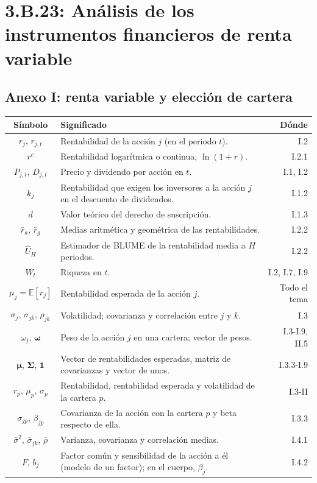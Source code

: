 \documentclass[10pt,a4paper]{article}
\newcommand{\cabecera}{\toprule\textbf{Símbolo} & \textbf{Significado} & \textbf{Dónde}\\\midrule\endhead\bottomrule\endfoot}
\begin{document}
\section{3.B.23: Análisis de los instrumentos financieros de renta variable}
\subsection*{Anexo I: renta variable y elección de cartera}
\begin{longtable}{SMD}
\cabecera
$r_j$, $r_{j,t}$ & Rentabilidad de la acción $j$ (en el periodo $t$). & I.2\\
$r^c$ & Rentabilidad logarítmica o continua, $\ln(1+r)$. & I.2.1\\
$P_{j,t}$, $D_{j,t}$ & Precio y dividendo por acción en $t$. & I.1, I.2\\
$k_j$ & Rentabilidad que exigen los inversores a la acción $j$ en el descuento de dividendos. & I.1.2\\
$d$ & Valor teórico del derecho de suscripción. & I.1.3\\
$\bar r_a$, $\bar r_g$ & Medias aritmética y geométrica de las rentabilidades. & I.2.2\\
$\hat U_H$ & Estimador de BLUME de la rentabilidad media a $H$ periodos. & I.2.2\\
$W_t$ & Riqueza en $t$. & I.2, I.7, I.9\\
$\mu_j=\mathbb E[r_j]$ & Rentabilidad esperada de la acción $j$. & Todo el tema\\
$\sigma_j$, $\sigma_{jk}$, $\rho_{jk}$ & Volatilidad; covarianza y correlación entre $j$ y $k$. & I.3\\
$\omega_j$, $\boldsymbol\omega$ & Peso de la acción $j$ en una cartera; vector de pesos. & I.3-I.9, II.5\\
$\boldsymbol\mu$, $\boldsymbol\Sigma$, $\mathbf 1$ & Vector de rentabilidades esperadas, matriz de covarianzas y vector de unos. & I.3.3-I.9\\
$r_p$, $\mu_p$, $\sigma_p$ & Rentabilidad, rentabilidad esperada y volatilidad de la cartera $p$. & I.3-II\\
$\sigma_{jp}$, $\beta_{jp}$ & Covarianza de la acción con la cartera $p$ y beta respecto de ella. & I.3.3\\
$\bar\sigma^2$, $\bar\sigma_{jk}$, $\bar\rho$ & Varianza, covarianza y correlación medias. & I.4.1\\
$F$, $b_j$ & Factor común y sensibilidad de la acción a él (modelo de un factor); en el cuerpo, $\beta_j$. & I.4.2\\

\end{longtable}
\end{document}
